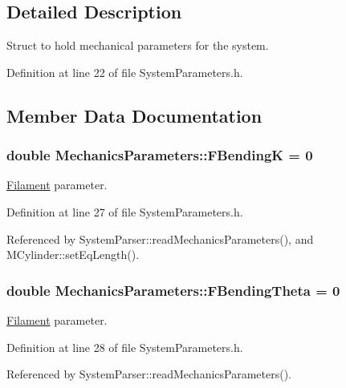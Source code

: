 \subsection{Detailed Description}
Struct to hold mechanical parameters for the system. 

Definition at line 22 of file System\+Parameters.\+h.



\subsection{Member Data Documentation}
\hypertarget{structMechanicsParameters_aa13b8fd35ef9f6574981c411b535fb83}{
\subsubsection[{F\+Bending\+K}]{\setlength{\rightskip}{0pt plus 5cm}double Mechanics\+Parameters\+::\+F\+Bending\+K = 0}}\label{structMechanicsParameters_aa13b8fd35ef9f6574981c411b535fb83}


\hyperlink{classFilament}{Filament} parameter. 



Definition at line 27 of file System\+Parameters.\+h.



Referenced by System\+Parser\+::read\+Mechanics\+Parameters(), and M\+Cylinder\+::set\+Eq\+Length().

\hypertarget{structMechanicsParameters_a143107fd6c26d306f4d57e1b006cccb5}{
\subsubsection[{F\+Bending\+Theta}]{\setlength{\rightskip}{0pt plus 5cm}double Mechanics\+Parameters\+::\+F\+Bending\+Theta = 0}}\label{structMechanicsParameters_a143107fd6c26d306f4d57e1b006cccb5}


\hyperlink{classFilament}{Filament} parameter. 



Definition at line 28 of file System\+Parameters.\+h.



Referenced by System\+Parser\+::read\+Mechanics\+Parameters().

